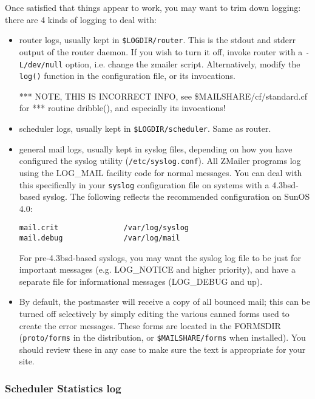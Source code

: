 Once satisfied that things appear to work, you may want to trim down
logging: there are 4 kinds of logging to deal with:
\begin{itemize}
\item router logs, usually kept in {\tt \$LOGDIR/router}.  This is the stdout
and stderr output of the router daemon.  If you wish to turn it off,
invoke router with a {\tt -L/dev/null} option, i.e. change the zmailer
script.  Alternatively, modify the {\tt log()} function in the
configuration file, or its invocations.

*** NOTE, THIS IS INCORRECT INFO, see  \$MAILSHARE/cf/standard.cf for
*** routine   dribble(),  and especially its invocations!
\item scheduler logs, usually kept in {\tt \$LOGDIR/scheduler}.  Same as router.
\item general mail logs, usually kept in syslog files, depending on how
you have configured the syslog utility ({\tt /etc/syslog.conf}).  All
ZMailer programs log using the LOG\_MAIL facility code for normal
messages.  You can deal with this specifically in your {\tt syslog}
configuration file on systems with a 4.3bsd-based syslog.  The
following reflects the recommended configuration on SunOS 4.0:
\begin{tscreen}
\begin{verbatim}
mail.crit               /var/log/syslog
mail.debug              /var/log/mail
\end{verbatim}
\end{tscreen}

For pre-4.3bsd-based syslogs, you may want the syslog log file
to be just for important messages (e.g. LOG\_NOTICE and higher
priority), and have a separate file for informational messages
(LOG\_DEBUG and up).
\item By default, the postmaster will receive a copy of all bounced
mail; this can be turned off selectively by simply editing the
various canned forms used to create the error messages.  These
forms are located in the FORMSDIR ({\tt proto/forms} in the distribution,
or {\tt \$MAILSHARE/forms} when installed).  You should review these
in any case to make sure the text is appropriate for your site.
\end{itemize}







\subsubsection{Scheduler Statistics log}

